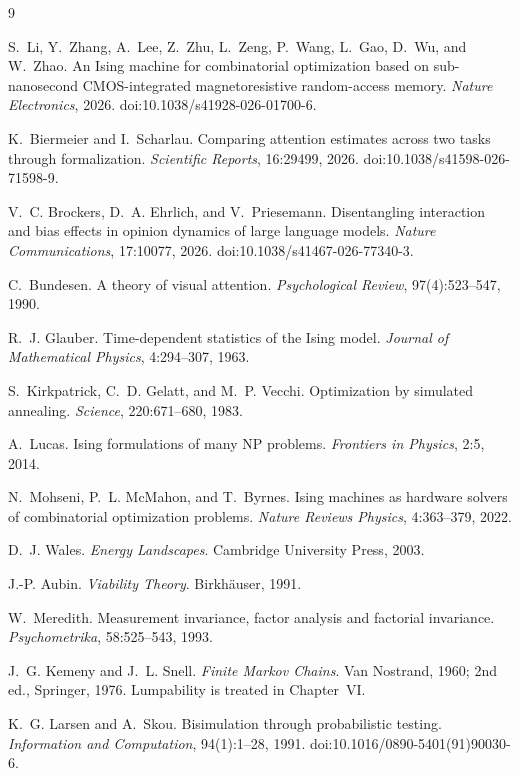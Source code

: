 \documentclass[11pt]{article}
\theoremstyle{definition}
\theoremstyle{remark}
\begin{document}
\begin{thebibliography}{9}

S.~Li, Y.~Zhang, A.~Lee, Z.~Zhu, L.~Zeng, P.~Wang, L.~Gao, D.~Wu, and W.~Zhao.
An Ising machine for combinatorial optimization based on sub-nanosecond CMOS-integrated magnetoresistive random-access memory.
\emph{Nature Electronics}, 2026.
doi:10.1038/s41928-026-01700-6.

K.~Biermeier and I.~Scharlau.
Comparing attention estimates across two tasks through formalization.
\emph{Scientific Reports}, 16:29499, 2026.
doi:10.1038/s41598-026-71598-9.

V.~C. Brockers, D.~A. Ehrlich, and V.~Priesemann.
Disentangling interaction and bias effects in opinion dynamics of large language models.
\emph{Nature Communications}, 17:10077, 2026.
doi:10.1038/s41467-026-77340-3.

C.~Bundesen.
A theory of visual attention.
\emph{Psychological Review}, 97(4):523--547, 1990.


R.~J. Glauber.
Time-dependent statistics of the Ising model.
\emph{Journal of Mathematical Physics}, 4:294--307, 1963.

S.~Kirkpatrick, C.~D. Gelatt, and M.~P. Vecchi.
Optimization by simulated annealing.
\emph{Science}, 220:671--680, 1983.

A.~Lucas.
Ising formulations of many NP problems.
\emph{Frontiers in Physics}, 2:5, 2014.

N.~Mohseni, P.~L. McMahon, and T.~Byrnes.
Ising machines as hardware solvers of combinatorial optimization problems.
\emph{Nature Reviews Physics}, 4:363--379, 2022.

D.~J. Wales.
\emph{Energy Landscapes}.
Cambridge University Press, 2003.

J.-P. Aubin.
\emph{Viability Theory}.
Birkh\"auser, 1991.

W.~Meredith.
Measurement invariance, factor analysis and factorial invariance.
\emph{Psychometrika}, 58:525--543, 1993.

J.~G. Kemeny and J.~L. Snell.
\emph{Finite Markov Chains}.
Van Nostrand, 1960; 2nd ed., Springer, 1976. Lumpability is treated in Chapter~VI.

K.~G. Larsen and A.~Skou.
Bisimulation through probabilistic testing.
\emph{Information and Computation}, 94(1):1--28, 1991.
doi:10.1016/0890-5401(91)90030-6.


\end{thebibliography}
\end{document}
